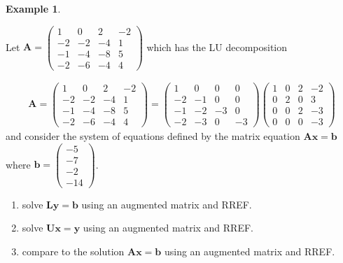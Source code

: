 \documentclass[
]{book}
\theoremstyle{definition}
\theoremstyle{definition}
\newtheorem{example}{Example}[chapter]
\theoremstyle{definition}
\theoremstyle{remark}
\begin{document}
\begin{example}
\protect\hypertarget{exm:unlabeled-div-79}{}\label{exm:unlabeled-div-79}

Let \(\mathbf{A} = \begin{pmatrix} 1 & 0 & 2 & -2 \\ -2 & -2 & -4 & 1 \\ -1 & -4 & -8 & 5 \\ -2 & -6 & -4 & 4 \end{pmatrix}\) which has the LU decomposition

\[
\begin{aligned}
\mathbf{A} = \begin{pmatrix} 1 & 0 & 2 & -2 \\ -2 & -2 & -4 & 1 \\ -1 & -4 & -8 & 5 \\ -2 & -6 & -4 & 4 \end{pmatrix} = \begin{pmatrix} 1 & 0 & 0 & 0 \\ -2 & -1 & 0 & 0 \\ -1 & -2 & -3 & 0 \\ -2 & -3 & 0 & -3 \end{pmatrix} \begin{pmatrix} 1 & 0 & 2 & -2 \\ 0 & 2 & 0 & 3 \\ 0 & 0 & 2 & -3 \\ 0 & 0 & 0 & -3 \end{pmatrix}
\end{aligned}
\]
and consider the system of equations defined by the matrix equation \(\mathbf{A} \mathbf{x} = \mathbf{b}\) where \(\mathbf{b} = \begin{pmatrix} -5 \\ -7 \\ -2 \\ -14 \end{pmatrix}\).

\begin{enumerate}
\def\labelenumi{\arabic{enumi})}
\item
  solve \(\mathbf{L} \mathbf{y} = \mathbf{b}\) using an augmented matrix and RREF.
\item
  solve \(\mathbf{U} \mathbf{x} = \mathbf{y}\) using an augmented matrix and RREF.
\item
  compare to the solution \(\mathbf{A}\mathbf{x} = \mathbf{b}\) using an augmented matrix and RREF.
\end{enumerate}

\end{example}
\end{document}
